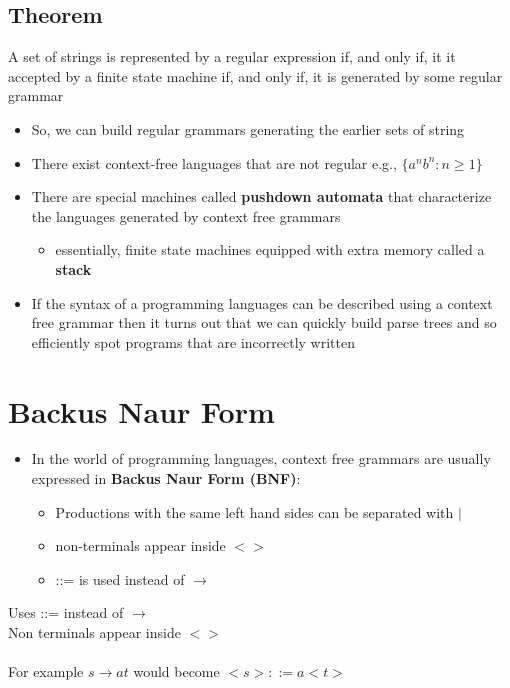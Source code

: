 \documentclass{article}[18pt]
\begin{document}
\subsection{Theorem}
A set of strings is represented by a regular expression if, and only if, it it accepted by a finite state machine if, and only if, it is generated by some regular grammar
\begin{itemize}
\item So, we can build regular grammars generating the earlier sets of string
\item There exist context-free languages that are not regular e.g., $\{a^nb^n: n\geqslant 1\}$
\item There are special machines called \textbf{pushdown automata} that characterize the languages generated by context free grammars
\begin{itemize}
\item essentially, finite state machines equipped with extra memory called a \textbf{stack}
\end{itemize}
\item If the syntax of a programming languages can be described using a context free grammar then it turns out that we can quickly build parse trees and so efficiently spot programs that are incorrectly written
\end{itemize}
\section{Backus Naur Form}
\begin{itemize}
\item In the world of programming languages, context free grammars are usually expressed in \textbf{Backus Naur Form (BNF)}:
\begin{itemize}
\item Productions with the same left hand sides can be separated with $|$
\item non-terminals appear inside $<>$
\item ::= is used instead of $\rightarrow$
\end{itemize}
\end{itemize}







Uses ::= instead of $\rightarrow$\\
Non terminals appear inside $<>$\\
\\
For example $s\rightarrow at$ would become $<s>::=a<t>$
\end{document}
